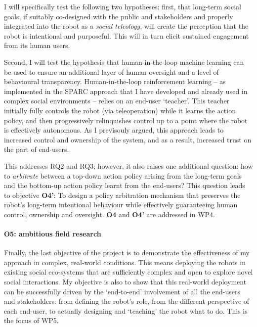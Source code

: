 I will specifically test the following two hypotheses: first, that long-term
social goals, if suitably co-designed with the public and stakeholders and
properly integrated into the robot as a \emph{social teleology}, will create the
perception that the robot is intentional and purposeful. This will in turn
elicit sustained engagement from its human users.

Second, I will test the hypothesis that human-in-the-loop machine learning can
be used to ensure an additional layer of human oversight and a level of
behavioural transparency.  Human-in-the-loop reinforcement learning -- as
implemented in the SPARC approach that I have developed and already used in
complex social
environments
-- relies on an end-user `teacher'. This teacher initially fully controls the
robot (via teleoperation) while it learns the action policy, and then
progressively relinquishes control up to a point where the robot is effectively
autonomous. As I previsouly argued, this approach
leads to increased control and ownership of the system, and as a result,
increased trust on the part of end-users.

This addresses RQ2 and RQ3; however, it also raises one additional question: how to
\emph{arbitrate} between a top-down action policy arising from the long-term goals and
the bottom-up action policy learnt from the end-users? This question leads to
objective {\bf O4'}: To design a policy arbitration mechanism that preserves
the robot's long-term intentional behaviour while effectively guaranteeing human
control, ownership and oversight. {\bf O4} and {\bf O4'} are addressed in WP4.

\paragraph{\bf O5: ambitious field research} Finally, the last objective of the
\project project is to demonstrate the effectiveness of my approach in complex,
real-world conditions. This means deploying the \project robots in existing
social eco-systems that are sufficiently complex and open to explore novel
social interactions. My objective is also to show that this real-world
deployment can be successfully driven by the `end-to-end' involvement of all the
end-users and stakeholders: from defining the robot's role, from the different
perspective of each end-user, to actually designing and `teaching' the
robot what to do. This is the focus of WP5.

